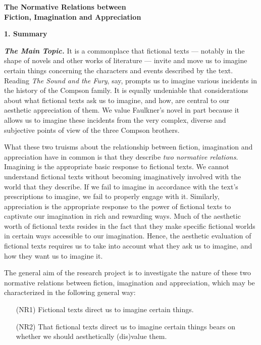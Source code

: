 \begin{center}
\noindent\textbf{\large The Normative Relations between\\ Fiction, Imagination and
Appreciation}
\end{center}


\noindent\textbf{\large 1. Summary}
\vspace{.1cm}

\noindent \textbf{\emph{The Main Topic.}} It is a commonplace that fictional texts --- notably in the shape of
novels and other works of literature --- invite and move us to imagine certain things
concerning the characters and events described by the text. Reading \emph{The Sound and the Fury}, say, prompts us to imagine various incidents in the history of the Compson family. It is equally undeniable that considerations about what fictional texts ask us to imagine, and how, are central to our aesthetic appreciation of them. We value Faulkner's novel in part because it allows us to imagine these incidents from the very complex, diverse and subjective points of view of the three Compson brothers.

What these two truisms about the relationship between fiction, imagination and appreciation have in common is that they describe \emph{two normative relations}. Imagining is the appropriate basic response to fictional texts. We cannot understand fictional texts without becoming imaginatively involved with the world that they describe. If we fail to imagine in accordance with the text's prescriptions to imagine, we fail to properly engage with it. Similarly, appreciation is the appropriate response to the power of fictional texts to captivate our imagination in rich and rewarding ways. Much of the aesthetic worth of fictional texts resides in the fact that they make specific fictional worlds in certain ways accessible to our imagination. Hence, the aesthetic evaluation of fictional texts requires us to take into account what they ask us to imagine, and how they want us to imagine it.

The general aim of the research project is to investigate the nature of these two normative relations between fiction, imagination and appreciation, which may be characterized in the following general way:


\vspace{-.1cm}
\begin{itemize}[leftmargin=2cm]
\item[{(NR1)}] Fictional texts direct us to imagine certain things.
\vspace{-.2cm}
\item[{(NR2)}] That fictional texts direct us to imagine certain things bears on whether we should aesthetically (dis)value them. 
\end{itemize}
\vspace{-.1cm}


